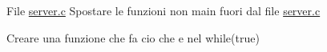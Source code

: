 
\begin{DoxyRefList}
\item[File \mbox{\hyperlink{server_8c}{server.c}} ]\label{todo__todo000001}%
%
Spostare le funzioni non main fuori dal file \mbox{\hyperlink{server_8c}{server.\+c}} 

Creare una funzione che fa cio\textquotesingle{} che e\textquotesingle{} nel while(true)
\end{DoxyRefList}